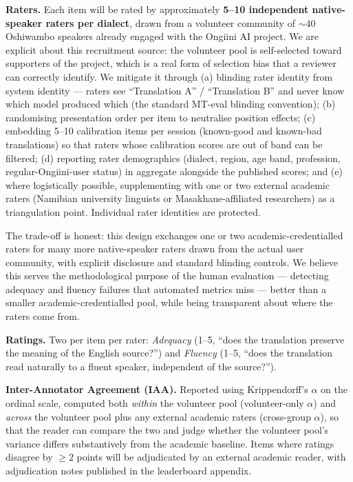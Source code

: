 \documentclass[11pt]{article}
\begin{document}
\textbf{Raters.} Each item will be rated by approximately
\textbf{5--10 independent native-speaker raters per dialect},
drawn from a volunteer community of $\sim 40$ Oshiwambo speakers
already engaged with the Ongiini AI project. We are explicit about
this recruitment source: the volunteer pool is self-selected
toward supporters of the project, which is a real form of
selection bias that a reviewer can correctly identify. We mitigate
it through (a) blinding rater identity from system identity ---
raters see ``Translation A'' / ``Translation B'' and never know
which model produced which (the standard MT-eval blinding
convention); (b) randomising presentation order per item to
neutralise position effects; (c) embedding 5--10 calibration
items per session (known-good and known-bad translations) so that
raters whose calibration scores are out of band can be filtered;
(d) reporting rater demographics (dialect, region, age band,
profession, regular-Ongiini-user status) in aggregate alongside
the published scores; and (e) where logistically possible,
supplementing with one or two external academic raters (Namibian
university linguists or Masakhane-affiliated researchers) as a
triangulation point. Individual rater identities are protected.

The trade-off is honest: this design exchanges one or two
academic-credentialled raters for many more native-speaker
raters drawn from the actual user community, with explicit
disclosure and standard blinding controls. We believe this serves
the methodological purpose of the human evaluation --- detecting
adequacy and fluency failures that automated metrics miss ---
better than a smaller academic-credentialled pool, while being
transparent about where the raters come from.

\textbf{Ratings.} Two per item per rater: \emph{Adequacy} (1--5,
``does the translation preserve the meaning of the English
source?'') and \emph{Fluency} (1--5, ``does the translation read
naturally to a fluent speaker, independent of the source?'').

\textbf{Inter-Annotator Agreement (IAA).} Reported using
Krippendorff's $\alpha$ \citep{krippendorff2004content} on the
ordinal scale, computed both \emph{within} the volunteer pool
(volunteer-only $\alpha$) and \emph{across} the volunteer pool
plus any external academic raters (cross-group $\alpha$), so that
the reader can compare the two and judge whether the volunteer
pool's variance differs substantively from the academic baseline.
Items where ratings disagree by $\geq 2$ points will be
adjudicated by an external academic reader, with adjudication
notes published in the leaderboard appendix.
\end{document}
